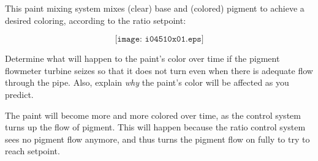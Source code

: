 

This paint mixing system mixes (clear) base and (colored) pigment to achieve a desired coloring, according to the ratio setpoint:

$$\texttt{[image: i04510x01.eps]}$$

Determine what will happen to the paint's color over time if the pigment flowmeter turbine seizes so that it does not turn even when there is adequate flow through the pipe.  Also, explain {\it why} the paint's color will be affected as you predict.







The paint will become more and more colored over time, as the control system turns up the flow of pigment.  This will happen because the ratio control system sees no pigment flow anymore, and thus turns the pigment flow on fully to try to reach setpoint.











